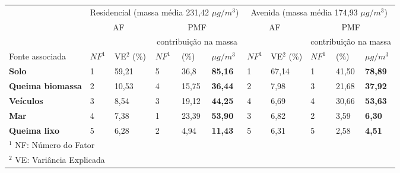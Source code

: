 \begin{tabular}{lll|lll|ll|lll}
\hline
                                                                         & \multicolumn{5}{c|}{Residencial (massa média 231,42 $\mu g / m^3$)} & \multicolumn{5}{c}{Avenida (massa média 174,93 $\mu g / m^3$)}    \\
                                                                          & \multicolumn{2}{c}{AF}      & \multicolumn{3}{c|}{PMF}              & \multicolumn{2}{c}{AF}                      & \multicolumn{3}{c}{PMF}          \\
\hline
  & & & \multicolumn{3}{c|}{contribuição na massa} & & & \multicolumn{3}{c}{contribuição na massa} \\
Fonte associada                                   & $NF^1$   & VE$^2$ (\%)               & $NF^1$   & (\%)   & $\mu g / m^3$  & $NF^1$       & VE$^2$  (\%)            & $NF^1$ & (\%)  & $\mu g / m^3$ \\
\hline
\textbf{Solo}                                     &  1   & 59,21                 & 5   & 36,8          & \textbf{85,16}   & 1       & 67,14                  & 1 & 41,50         & \textbf{78,89}  \\
\textbf{Queima biomassa}                          &  2   & 10,53                 & 4   & 15,75        & \textbf{36,44}      & 2       & 7,98                 & 3 & 21,68         & \textbf{37,92 }  \\
\textbf{Veículos}                                 &  3   & 8,54                  & 3   & 19,12           & \textbf{44,25}  & 4       & 6,69                  & 4 & 30,66          & \textbf{53,63 } \\
\textbf{Mar}                                      &  4   & 7,38                  & 1   & 23,39          & \textbf{53,90}   & 3       & 6,82                  & 2 & 3,59           & \textbf{6,30}  \\
\textbf{Queima lixo}                              &  5   & 6,28                  & 2   & 4,94         & \textbf{11,43}   & 5       & 6,31                    & 5 & 2,58           & \textbf{4,51} \\

\hline
\multicolumn{11}{l}{$^1$ NF: Número do Fator} \\
\multicolumn{11}{l}{$^2$ VE: Variância Explicada} \\
\hline
\end{tabular}
